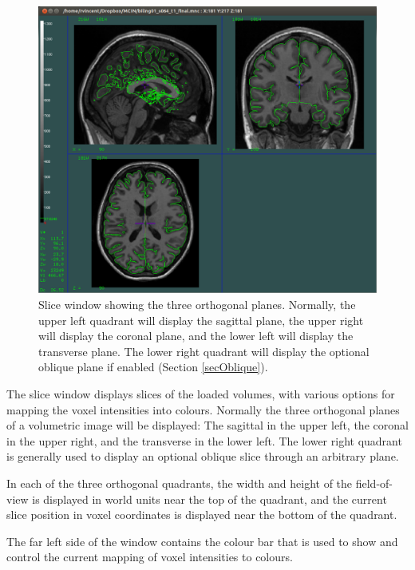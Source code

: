 \documentclass[11pt,letterpaper]{article}
\begin{document}
\begin{figure}
\centering
\includegraphics[width=0.8\linewidth]{display-slice.png}
\caption{Slice window showing the three orthogonal planes. Normally,
 the upper left quadrant will display the sagittal plane, the upper
 right will display the coronal plane, and the lower left will
 display the transverse plane. The lower right quadrant will display
 the optional oblique plane if enabled (Section \ref{secOblique}).}
\label{winSlice}
\end{figure}

The slice window displays slices of the loaded volumes, with various
options for mapping the voxel intensities into colours. Normally the
three orthogonal planes of a volumetric image will be displayed: The
sagittal in the upper left, the coronal in the upper right, and the
transverse in the lower left. The lower right quadrant is generally
used to display an optional oblique slice through an arbitrary plane.

In each of the three orthogonal quadrants, the width and height of the
field-of-view is displayed in world units near the top of the
quadrant, and the current slice position in voxel coordinates is
displayed near the bottom of the quadrant.

The far left side of the window contains the colour bar that is used
to show and control the current mapping of voxel intensities to
colours. 
\end{document}
